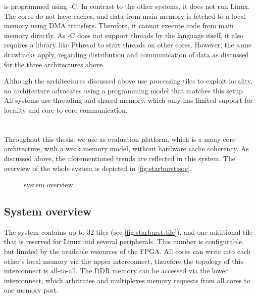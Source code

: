 \Epiphany is programmed using -C.
In contrast to the other systems, it does not run Linux.
The cores do not have caches, and data from main memory is fetched to a local memory using \ac{DMA} transfers.
Therefore, it cannot execute code from main memory directly.
As -C does not support threads by the language itself, it also requires a library like Pthread to start threads on other cores.
However, the same drawbacks apply, regarding distribution and communication of data as discussed for the three architectures above.

Although the architectures discussed above use processing tiles to exploit locality, no architecture advocates using a programming model that matches this setup.
All systems use threading and shared memory, which only has limited support for locality and core-to-core communication.


\section{\Starburst}
\label{s:starburst:architecture}

Throughout this thesis, we use \Starburst* as evaluation platform, which is a many-core   architecture, with a weak memory model, without hardware cache coherency.
As discussed above, the aforementioned trends are reflected in this system.
The overview of the whole system is depicted in \vref{fig:starburst:soc}.

\begin{figure}%
%
\caption{\Starburst system overview}%
\label{fig:starburst:soc}%
\end{figure}

\subsection{System overview}

The system contains up to 32 \MicroBlaze* tiles (see \vref{fig:starburst:tile}), and one additional tile that is reserved for Linux and several peripherals.
This number is configurable, but limited by the available resources of the \ac{FPGA}.
All cores can write into each other's local memory via the upper interconnect, therefore the topology of this interconnect is all-to-all.
The \ac{DDR} memory can be accessed via the lower interconnect, which arbitrates and multiplexes memory requests from all cores to one memory port.

